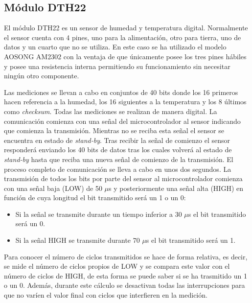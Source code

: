 \subsection{M\'odulo DTH22}\label{subsec:dht22}

El m\'odulo DTH22 es un sensor de humedad y temperatura
digital. Normalmente el sensor cuenta con 4 pines, uno para la
alimentaci\'on, otro para tierra, uno de datos y un cuarto que no se
utiliza. En este caso se ha utilizado el modelo AOSONG AM2302 con la
ventaja de que \'unicamente posee los tres pines h\'abiles y posee una
resistencia interna permitiendo su funcionamiento sin necesitar
ning\'un otro componente.

Las mediciones se llevan a cabo en conjuntos de 40 bits donde los 16
primeros hacen referencia a la humedad, los 16 siguientes a la
temperatura y los 8 \'ultimos como \emph{checksum}. Todas las mediciones se
realizan de manera digital. La comunicaci\'on comienza con una se\~nal
del microcontrolador al sensor indicando que comienza la
transmisi\'on. Mientras no se reciba esta se\~nal el sensor se encuentra
en estado de \emph{stand-by}. Tras recibir la se\~nal de comienzo el sensor
responder\'a enviando los 40 bits de datos tras los cuales volver\'a
al estado de \emph{stand-by} hasta que reciba una nueva se\~nal de comienzo de
la transmisi\'on. El proceso completo de comunicaci\'on se lleva a
cabo en unos dos segundos. La transmisi\'on de todos los bits por
parte del sensor al microcontrolador comienza con una se\~nal baja (LOW)
de 50 $\mu$s y posteriormente una se\~nal alta (HIGH) en funci\'on de
cuya longitud el bit transmitido ser\'a un 1 o un 0:
\begin{itemize}
\item Si la se\~nal se transmite durante un tiempo inferior a 30 $\mu$s
  el bit transmitido ser\'a un 0.

\item Si la se\~nal HIGH se transmite durante 70 $\mu$s el bit
  transmitido ser\'a un 1.

\end{itemize}

Para conocer el n\'umero de ciclos transmitidos se hace de forma relativa, es decir,
se mide el n\'umero de ciclos propios de LOW y se compara este valor con
el n\'umero de ciclos de HIGH, de esta forma se puede saber si se ha trasmitido
un 1 o un 0. Adem\'as, durante este c\'alculo se desactivan todas las interrupciones
para que no var\'ien el valor final con ciclos que interfieren en la medici\'on.
